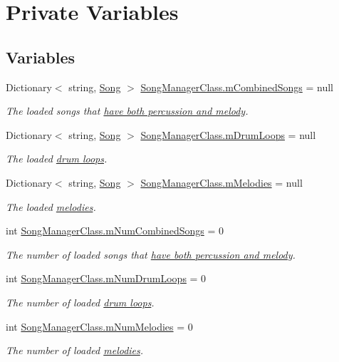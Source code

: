 \hypertarget{group___s_m_priv_var}{}\section{Private Variables}
\label{group___s_m_priv_var}
\subsection*{Variables}
\begin{DoxyCompactItemize}
\item 
Dictionary$<$ string, \hyperlink{class_song}{Song} $>$ \hyperlink{group___s_m_priv_var_gaf6b4ff41b8da95d10ad3db62df111faa}{Song\+Manager\+Class.\+m\+Combined\+Songs} = null
\begin{DoxyCompactList}\small\item\em The loaded songs that \hyperlink{group___song_group_DocSongCombined}{have both percussion and melody}. \end{DoxyCompactList}\item 
Dictionary$<$ string, \hyperlink{class_song}{Song} $>$ \hyperlink{group___s_m_priv_var_ga84f25335035755448d11acb9287360f2}{Song\+Manager\+Class.\+m\+Drum\+Loops} = null
\begin{DoxyCompactList}\small\item\em The loaded \hyperlink{group___song_group_DocSongDrumLoop}{drum loops}. \end{DoxyCompactList}\item 
Dictionary$<$ string, \hyperlink{class_song}{Song} $>$ \hyperlink{group___s_m_priv_var_ga935e80f645d0546003f7df8443b79242}{Song\+Manager\+Class.\+m\+Melodies} = null
\begin{DoxyCompactList}\small\item\em The loaded \hyperlink{group___song_group_DocSongMelody}{melodies}. \end{DoxyCompactList}\item 
int \hyperlink{group___s_m_priv_var_gae423c7b9efd0e2ef721820318200e5f9}{Song\+Manager\+Class.\+m\+Num\+Combined\+Songs} = 0
\begin{DoxyCompactList}\small\item\em The number of loaded songs that \hyperlink{group___song_group_DocSongCombined}{have both percussion and melody}. \end{DoxyCompactList}\item 
int \hyperlink{group___s_m_priv_var_ga0ea9b6c8343a9b2cbe0eb375edaef247}{Song\+Manager\+Class.\+m\+Num\+Drum\+Loops} = 0
\begin{DoxyCompactList}\small\item\em The number of loaded \hyperlink{group___song_group_DocSongDrumLoop}{drum loops}. \end{DoxyCompactList}\item 
int \hyperlink{group___s_m_priv_var_ga58ea3b4f794b9e444eece384ae6e8197}{Song\+Manager\+Class.\+m\+Num\+Melodies} = 0
\begin{DoxyCompactList}\small\item\em The number of loaded \hyperlink{group___song_group_DocSongMelody}{melodies}. \end{DoxyCompactList}\end{DoxyCompactItemize}


